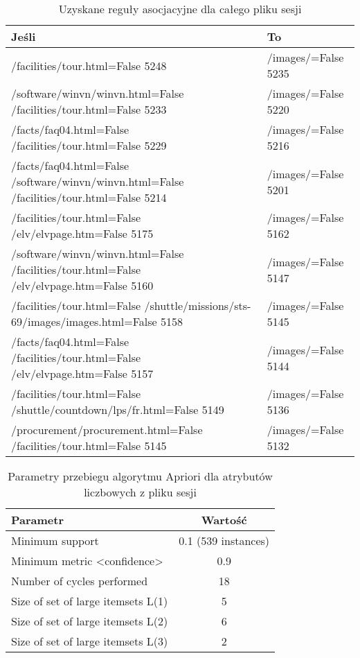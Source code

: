 \documentclass[../EDI_Task1_Karwowski_Kowalewski.tex]{subfiles}
\begin{document}
{    \begin{table}[!htbp]
        \scriptsize
        \centering
        \begin{tabular}{|l|l|}
            \hline
            Jeśli & To \\ \hline
            /facilities/tour.html=False 5248 & /images/=False 5235\\
            /software/winvn/winvn.html=False /facilities/tour.html=False 5233 & /images/=False 5220\\
            /facts/faq04.html=False /facilities/tour.html=False 5229 & /images/=False 5216\\
            /facts/faq04.html=False /software/winvn/winvn.html=False /facilities/tour.html=False 5214 & /images/=False 5201\\
            /facilities/tour.html=False /elv/elvpage.htm=False 5175 & /images/=False 5162\\
            /software/winvn/winvn.html=False /facilities/tour.html=False /elv/elvpage.htm=False 5160 & /images/=False 5147\\
            /facilities/tour.html=False /shuttle/missions/sts-69/images/images.html=False 5158 & /images/=False 5145\\
            /facts/faq04.html=False /facilities/tour.html=False /elv/elvpage.htm=False 5157 & /images/=False 5144\\
            /facilities/tour.html=False /shuttle/countdown/lps/fr.html=False 5149 & /images/=False 5136\\
            /procurement/procurement.html=False /facilities/tour.html=False 5145 & /images/=False 5132\\ \hline
        \end{tabular}
        \caption
        {Uzyskane reguły asocjacyjne dla całego pliku sesji}
        \label{asociate_rules}
    \end{table}
    \FloatBarrier

     \begin{table}[!htbp]
        \footnotesize
        \centering
        \begin{tabular}{|l|c|}
            \hline
            Parametr & Wartość \\ \hline
           Minimum support & 0.1 (539 instances) \\
            Minimum metric <confidence> & 0.9 \\
            Number of cycles performed & 18 \\
            Size of set of large itemsets L(1) & 5 \\
            Size of set of large itemsets L(2) & 6 \\
            Size of set of large itemsets L(3) & 2 \\ \hline
        \end{tabular}
        \caption
        {Parametry przebiegu algorytmu Apriori dla atrybutów liczbowych z pliku sesji}
        \label{apriori_params_numeric}
    \end{table}

}
\end{document}
